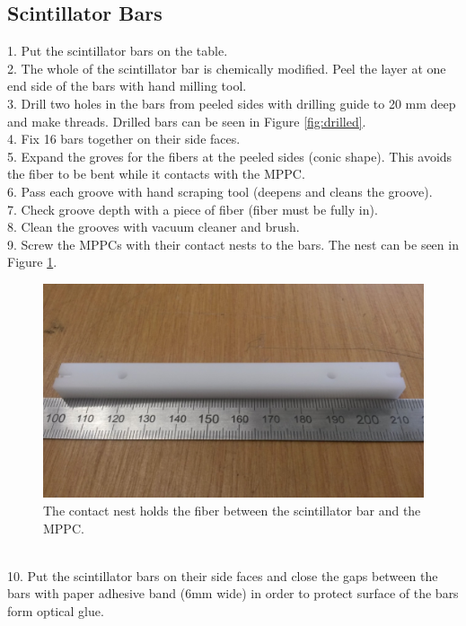 \documentclass[a4paper]{article}\linespread{1.4}
\begin{document}
\subsection{Scintillator Bars}
1.	Put the scintillator bars on the table.
\\2.	The whole of the scintillator bar is chemically modified. Peel the layer at one end side of the bars with hand milling tool.
\\3.	Drill two holes in the bars from peeled sides with drilling guide to 20 mm deep and make threads. Drilled bars can be seen in Figure \ref{fig:drilled}.
\\4.	Fix 16 bars together on their side faces.
\\5.	Expand the groves for the fibers at the peeled sides (conic shape). This avoids the fiber to be bent while it contacts with the MPPC.
\\6.	Pass each groove with hand scraping tool (deepens and cleans the groove).
\\7.	Check groove depth with a piece of fiber (fiber must be fully in).
\\8.	Clean the grooves with vacuum cleaner and brush.
\\9.	Screw the MPPCs with their contact nests to the bars. The nest can be seen in Figure \ref{fig:nest}.
\begin{figure}[h!] \hspace*{-0.5cm} \includegraphics[width=135mm,scale=2.0]{figures/nestpaint.jpg} \caption{The contact nest holds the fiber between the scintillator bar and the MPPC.}  \label{fig:nest}\end{figure}
\\10.	Put the scintillator bars on their side faces and close the gaps between the bars with paper adhesive band (6mm wide) in order to protect surface of the bars form optical glue.
\end{document}
